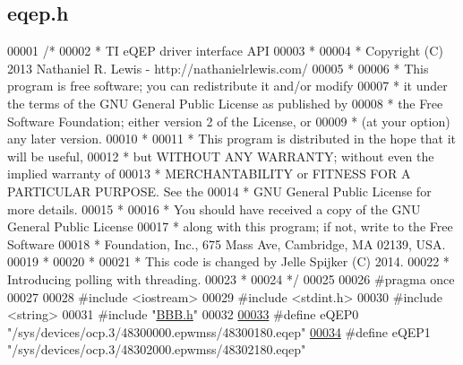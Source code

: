 \hypertarget{eqep_8h_source}{}\subsection{eqep.\+h}
\label{eqep_8h_source}

\begin{DoxyCode}
00001 \textcolor{comment}{/*}
00002 \textcolor{comment}{* TI eQEP driver interface API}
00003 \textcolor{comment}{*}
00004 \textcolor{comment}{* Copyright (C) 2013 Nathaniel R. Lewis - http://nathanielrlewis.com/}
00005 \textcolor{comment}{*}
00006 \textcolor{comment}{* This program is free software; you can redistribute it and/or modify}
00007 \textcolor{comment}{* it under the terms of the GNU General Public License as published by}
00008 \textcolor{comment}{* the Free Software Foundation; either version 2 of the License, or}
00009 \textcolor{comment}{* (at your option) any later version.}
00010 \textcolor{comment}{*}
00011 \textcolor{comment}{* This program is distributed in the hope that it will be useful,}
00012 \textcolor{comment}{* but WITHOUT ANY WARRANTY; without even the implied warranty of}
00013 \textcolor{comment}{* MERCHANTABILITY or FITNESS FOR A PARTICULAR PURPOSE. See the}
00014 \textcolor{comment}{* GNU General Public License for more details.}
00015 \textcolor{comment}{*}
00016 \textcolor{comment}{* You should have received a copy of the GNU General Public License}
00017 \textcolor{comment}{* along with this program; if not, write to the Free Software}
00018 \textcolor{comment}{* Foundation, Inc., 675 Mass Ave, Cambridge, MA 02139, USA.}
00019 \textcolor{comment}{*}
00020 \textcolor{comment}{*}
00021 \textcolor{comment}{* This code is changed by Jelle Spijker (C) 2014.}
00022 \textcolor{comment}{* Introducing polling with threading.}
00023 \textcolor{comment}{*}
00024 \textcolor{comment}{*/}
00025 
00026 \textcolor{preprocessor}{#pragma once}
00027 
00028 \textcolor{preprocessor}{#include <iostream>}
00029 \textcolor{preprocessor}{#include <stdint.h>}
00030 \textcolor{preprocessor}{#include <string>}
00031 \textcolor{preprocessor}{#include "\hyperlink{_b_b_b_8h}{BBB.h}"}
00032 
\hypertarget{eqep_8h_source_l00033}{}\hyperlink{eqep_8h_a6b7cf82bbc86508b5df1d751c202e601}{00033} \textcolor{preprocessor}{#define eQEP0 "/sys/devices/ocp.3/48300000.epwmss/48300180.eqep"}
\hypertarget{eqep_8h_source_l00034}{}\hyperlink{eqep_8h_a490269705de1a8a0cc6d52c6cdbaa422}{00034} \textcolor{preprocessor}{#define eQEP1 "/sys/devices/ocp.3/48302000.epwmss/48302180.eqep"}

\end{DoxyCode}
